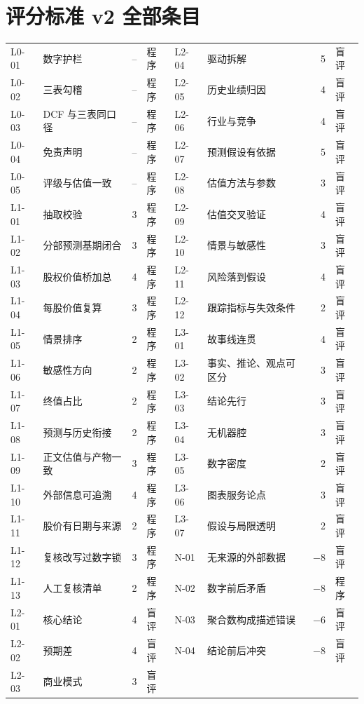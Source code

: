 \section{评分标准 v2 全部条目}

\begin{table}[H]
\centering
\footnotesize
\setlength{\tabcolsep}{4pt}
\begin{tabularx}{\linewidth}{@{}l L r l @{\hspace{14pt}} l L r l@{}}
\toprule
{} &  &  &  &  &  &  &  \\
\midrule
L0-01 & 数字护栏 & -- & 程序 & L2-04 & 驱动拆解 & 5 & 盲评 \\
L0-02 & 三表勾稽 & -- & 程序 & L2-05 & 历史业绩归因 & 4 & 盲评 \\
L0-03 & DCF 与三表同口径 & -- & 程序 & L2-06 & 行业与竞争 & 4 & 盲评 \\
L0-04 & 免责声明 & -- & 程序 & L2-07 & 预测假设有依据 & 5 & 盲评 \\
L0-05 & 评级与估值一致 & -- & 程序 & L2-08 & 估值方法与参数 & 3 & 盲评 \\
L1-01 & 抽取校验 & 3 & 程序 & L2-09 & 估值交叉验证 & 4 & 盲评 \\
L1-02 & 分部预测基期闭合 & 3 & 程序 & L2-10 & 情景与敏感性 & 3 & 盲评 \\
L1-03 & 股权价值桥加总 & 4 & 程序 & L2-11 & 风险落到假设 & 4 & 盲评 \\
L1-04 & 每股价值复算 & 3 & 程序 & L2-12 & 跟踪指标与失效条件 & 2 & 盲评 \\
L1-05 & 情景排序 & 2 & 程序 & L3-01 & 故事线连贯 & 4 & 盲评 \\
L1-06 & 敏感性方向 & 2 & 程序 & L3-02 & 事实、推论、观点可区分 & 3 & 盲评 \\
L1-07 & 终值占比 & 2 & 程序 & L3-03 & 结论先行 & 3 & 盲评 \\
L1-08 & 预测与历史衔接 & 2 & 程序 & L3-04 & 无机器腔 & 3 & 盲评 \\
L1-09 & 正文估值与产物一致 & 3 & 程序 & L3-05 & 数字密度 & 2 & 盲评 \\
L1-10 & 外部信息可追溯 & 4 & 程序 & L3-06 & 图表服务论点 & 3 & 盲评 \\
L1-11 & 股价有日期与来源 & 2 & 程序 & L3-07 & 假设与局限透明 & 2 & 盲评 \\
L1-12 & 复核改写过数字锁 & 3 & 程序 & N-01 & 无来源的外部数据 & $-8$ & 盲评 \\
L1-13 & 人工复核清单 & 2 & 程序 & N-02 & 数字前后矛盾 & $-8$ & 程序 \\
L2-01 & 核心结论 & 4 & 盲评 & N-03 & 聚合数构成描述错误 & $-6$ & 盲评 \\
L2-02 & 预期差 & 4 & 盲评 & N-04 & 结论前后冲突 & $-8$ & 盲评 \\
L2-03 & 商业模式 & 3 & 盲评 & & & & \\
\bottomrule
\end{tabularx}
\end{table}

